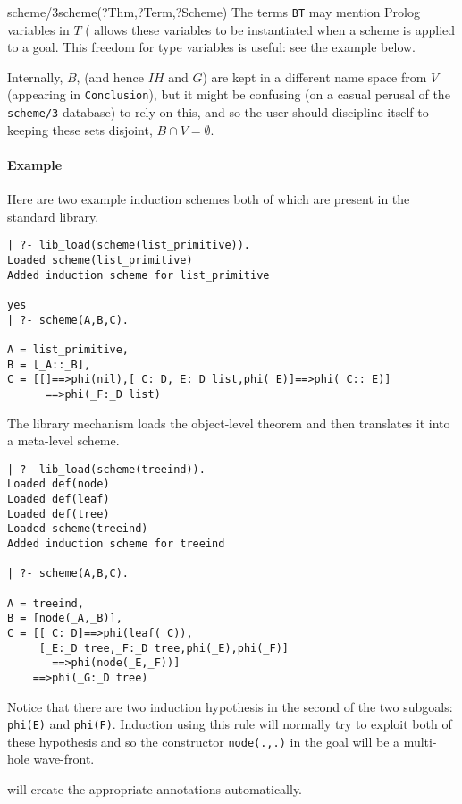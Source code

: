\begin{predicate}{scheme/3}{scheme(?Thm,?Term,?Scheme)}
The terms {\tt BT} may mention Prolog variables in $T$ (
allows these variables to be instantiated when a scheme is applied to
a goal.  This freedom for type variables is useful: see the example
below.
  
Internally, $B$, (and hence $IH$ and $G$) are kept in a different name
space from $V$ (appearing in {\tt Conclusion}), but it might be
confusing (on a casual perusal of the {\tt scheme/3} database) to rely
on this, and so the user should discipline itself to keeping these
sets disjoint, $B \cap V = \emptyset$.

\paragraph {Example} Here are two example induction schemes both of
which are present in the standard \clam library.

\begin{verbatim}
| ?- lib_load(scheme(list_primitive)).
Loaded scheme(list_primitive)
Added induction scheme for list_primitive

yes
| ?- scheme(A,B,C).

A = list_primitive,
B = [_A::_B],
C = [[]==>phi(nil),[_C:_D,_E:_D list,phi(_E)]==>phi(_C::_E)]
      ==>phi(_F:_D list)
\end{verbatim}
The library mechanism loads the object-level theorem  and then
translates it into a meta-level scheme.  

\begin{verbatim}
| ?- lib_load(scheme(treeind)).
Loaded def(node)
Loaded def(leaf)
Loaded def(tree)
Loaded scheme(treeind)
Added induction scheme for treeind

| ?- scheme(A,B,C).

A = treeind,
B = [node(_A,_B)],
C = [[_C:_D]==>phi(leaf(_C)),
     [_E:_D tree,_F:_D tree,phi(_E),phi(_F)]
       ==>phi(node(_E,_F))]
    ==>phi(_G:_D tree)
\end{verbatim}
Notice that there are two induction hypothesis in the second of
the two subgoals: {\tt phi(E)} and {\tt phi(F)}.  Induction using this
rule will normally try to exploit both of these hypothesis and so the
constructor {\tt node(.,.)} in the goal will be a multi-hole
wave-front.  

 will create the appropriate annotations automatically.
\end{predicate}

